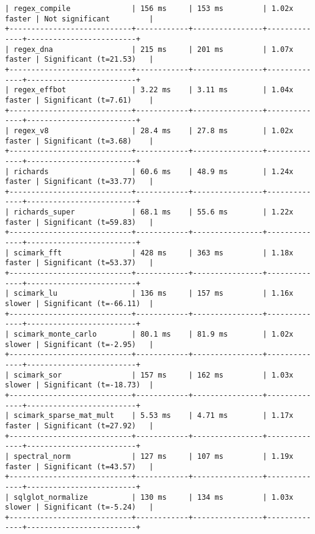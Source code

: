 \begin{code}
\begin{verbatim}
| regex_compile              | 156 ms     | 153 ms         | 1.02x faster | Not significant         |
+----------------------------+------------+----------------+--------------+-------------------------+
| regex_dna                  | 215 ms     | 201 ms         | 1.07x faster | Significant (t=21.53)   |
+----------------------------+------------+----------------+--------------+-------------------------+
| regex_effbot               | 3.22 ms    | 3.11 ms        | 1.04x faster | Significant (t=7.61)    |
+----------------------------+------------+----------------+--------------+-------------------------+
| regex_v8                   | 28.4 ms    | 27.8 ms        | 1.02x faster | Significant (t=3.68)    |
+----------------------------+------------+----------------+--------------+-------------------------+
| richards                   | 60.6 ms    | 48.9 ms        | 1.24x faster | Significant (t=33.77)   |
+----------------------------+------------+----------------+--------------+-------------------------+
| richards_super             | 68.1 ms    | 55.6 ms        | 1.22x faster | Significant (t=59.83)   |
+----------------------------+------------+----------------+--------------+-------------------------+
| scimark_fft                | 428 ms     | 363 ms         | 1.18x faster | Significant (t=53.37)   |
+----------------------------+------------+----------------+--------------+-------------------------+
| scimark_lu                 | 136 ms     | 157 ms         | 1.16x slower | Significant (t=-66.11)  |
+----------------------------+------------+----------------+--------------+-------------------------+
| scimark_monte_carlo        | 80.1 ms    | 81.9 ms        | 1.02x slower | Significant (t=-2.95)   |
+----------------------------+------------+----------------+--------------+-------------------------+
| scimark_sor                | 157 ms     | 162 ms         | 1.03x slower | Significant (t=-18.73)  |
+----------------------------+------------+----------------+--------------+-------------------------+
| scimark_sparse_mat_mult    | 5.53 ms    | 4.71 ms        | 1.17x faster | Significant (t=27.92)   |
+----------------------------+------------+----------------+--------------+-------------------------+
| spectral_norm              | 127 ms     | 107 ms         | 1.19x faster | Significant (t=43.57)   |
+----------------------------+------------+----------------+--------------+-------------------------+
| sqlglot_normalize          | 130 ms     | 134 ms         | 1.03x slower | Significant (t=-5.24)   |
+----------------------------+------------+----------------+--------------+-------------------------+

\end{verbatim}
\end{code}
